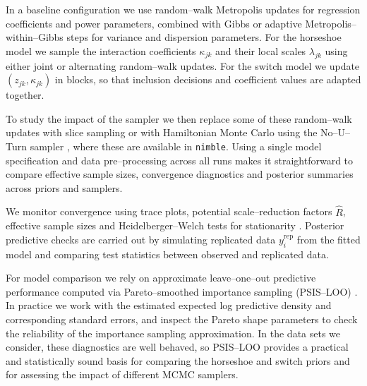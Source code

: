 \documentclass[11pt]{article}
\begin{document}
\begin{doublespacing}
\begin{linenumbers}
\begin{flushleft}
In a baseline configuration we use random–walk Metropolis updates for regression coefficients and power parameters, combined with Gibbs or adaptive Metropolis–within–Gibbs steps for variance and dispersion parameters. For the horseshoe model we sample the interaction coefficients $\kappa_{jk}$ and their local scales $\lambda_{jk}$ using either joint or alternating random–walk updates. For the switch model we update $(z_{jk},\kappa_{jk})$ in blocks, so that inclusion decisions and coefficient values are adapted together.

To study the impact of the sampler we then replace some of these random–walk updates with slice sampling \citep{2003_neal} or with Hamiltonian Monte Carlo using the No–U–Turn sampler \citep{2014_hoffman}, where these are available in \texttt{nimble}. Using a single model specification and data pre–processing across all runs makes it straightforward to compare effective sample sizes, convergence diagnostics and posterior summaries across priors and samplers.

We monitor convergence using trace plots, potential scale–reduction factors $\widehat{R}$, effective sample sizes and Heidelberger–Welch tests for stationarity \citep{1983_heidelberger,2014_gelman}. Posterior predictive checks are carried out by simulating replicated data $y_i^{\mathrm{rep}}$ from the fitted model and comparing test statistics between observed and replicated data.

For model comparison we rely on approximate leave–one–out predictive performance computed via Pareto–smoothed importance sampling (PSIS–LOO) \citep{2017_vehtari}. In practice we work with the estimated expected log predictive density and corresponding standard errors, and inspect the Pareto shape parameters to check the reliability of the importance sampling approximation. In the data sets we consider, these diagnostics are well behaved, so PSIS–LOO provides a practical and statistically sound basis for comparing the horseshoe and switch priors and for assessing the impact of different MCMC samplers.




\end{flushleft}
\end{linenumbers}
\end{doublespacing}
\end{document}
